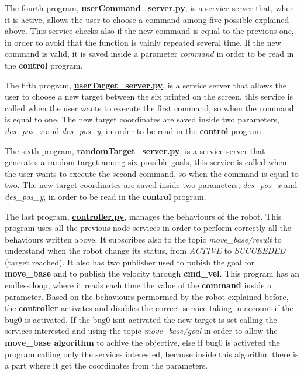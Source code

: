 \begin{DoxyItemize}
\begin{DoxyItemize}
\end{DoxyItemize}
\item The fourth program, {\bfseries \hyperlink{user_command__server_8py}{user\+Command\+\_\+server.\+py}}, is a service server that, when it is active, allows the user to choose a command among five possible explained above. This service checks also if the new command is equal to the previous one, in order to avoid that the function is vainly repeated several time. If the new command is valid, it is saved inside a parameter {\itshape command} in order to be read in the {\bfseries control} program.
\item The fifth program, {\bfseries \hyperlink{user_target__server_8py}{user\+Target\+\_\+server.\+py}}, is a service server that allows the user to choose a new target between the six printed on the screen, this service is called when the user wants to execute the first command, so when the command is equal to one. The new target coordinates are saved inside two parameters, {\itshape des\+\_\+pos\+\_\+x} and {\itshape des\+\_\+pos\+\_\+y}, in order to be read in the {\bfseries control} program.
\item The sixth program, {\bfseries \hyperlink{random_target__server_8py}{random\+Target\+\_\+server.\+py}}, is a service server that generates a random target among six possible goals, this service is called when the user wants to execute the second command, so when the command is equal to two. The new target coordinates are saved inside two parameters, {\itshape des\+\_\+pos\+\_\+x} and {\itshape des\+\_\+pos\+\_\+y}, in order to be read in the {\bfseries control} program.
\item The last program, {\bfseries \hyperlink{controller_8py}{controller.\+py}}, manages the behaviours of the robot. This program uses all the previous node services in order to perform correctly all the behaviours written above. It subscribes also to the topic {\itshape move\+\_\+base/result} to understand when the robot change its status, from {\itshape A\+C\+T\+I\+VE} to {\itshape S\+U\+C\+C\+E\+E\+D\+ED} (target reached). It also has two publisher used to pubish the goal for {\bfseries move\+\_\+base} and to publish the velocity through {\bfseries cmd\+\_\+vel}. This program has an endless loop, where it reads each time the value of the {\bfseries command} inside a parameter. Based on the behaviours permormed by the robot explained before, the {\bfseries controller} activates and disables the correct service taking in account if the bug0 is activated. If the bug0 isn\textquotesingle{}t activated the new target is set calling the services interested and using the topic {\itshape move\+\_\+base/goal} in order to allow the {\bfseries move\+\_\+base algorithm} to achive the objective, else if bug0 is activeted the program calling only the services interested, because inside this algorithm there is a part where it get the coordinates from the parameters.
\end{DoxyItemize}

